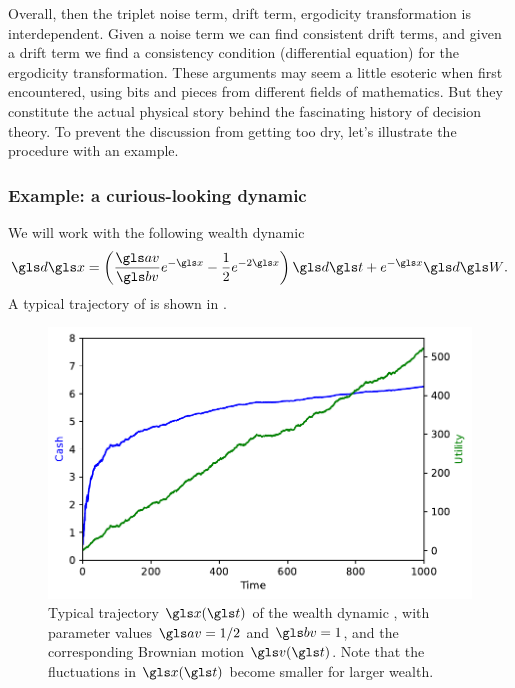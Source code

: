 Overall, then the triplet noise term, drift term, ergodicity transformation is
interdependent. Given a noise term we can find consistent drift terms,
and given a drift term we find a consistency condition (differential
equation) for the ergodicity transformation. These arguments may seem a little
esoteric when first encountered, using bits and pieces from different 
fields of mathematics. But they constitute the actual physical story behind the
fascinating history of decision theory. To prevent the discussion from getting too 
dry, let's illustrate the procedure with an example.

\subsubsection{Example: a curious-looking dynamic}

We will work with the following wealth dynamic
\begin{equation}
\gd\x=\left(\frac{\av}{\bv}e^{-\x}-\frac{1}{2}e^{-2\x}\right)\gd\t+e^{-\x}\gd\gW.
\elabel{test_dyn}
\end{equation}
A typical trajectory of  is shown in .

\begin{figure}
\centering
\includegraphics[width=\textwidth]{./chapter_riskless/figs/trajectories.pdf}
\caption{\small Typical trajectory $\x(\t)$ of the wealth
dynamic , with parameter values $\av=1/2$ and $\bv=1$,  and the corresponding Brownian motion $\gv(\t)$. Note that the fluctuations in $\x(\t)$ become smaller for larger wealth. }
\end{figure}

